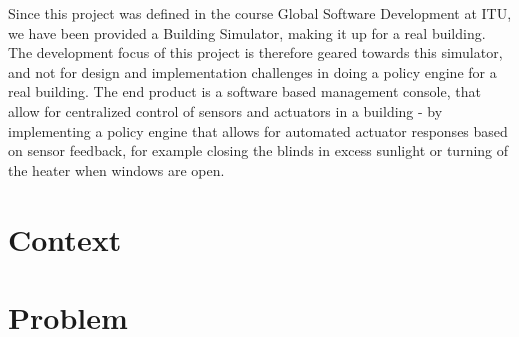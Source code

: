 Since this project was defined in the course Global Software Development at ITU, we have been provided a Building Simulator, making it up for a real building. The development focus of this project is therefore geared towards this simulator, and not for design and implementation challenges in doing a policy engine for a real building. The end product is a software based management console, that allow for centralized control of sensors and actuators in a building - by implementing a policy engine that allows for automated actuator responses based on sensor feedback, for example closing the blinds in excess sunlight or turning of the heater when windows are open.
\section{Context}

\section{Problem}

